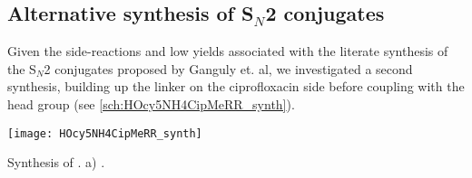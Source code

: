 \subsection{Alternative synthesis of S$_N$2 conjugates}

Given the side-reactions and low yields associated with the literate synthesis of the S$_N$2 conjugates proposed by Ganguly et. al\cite{Ganguly2011}, we investigated a second synthesis, building up the linker on the ciprofloxacin side before coupling with the head group (see \ref{sch:HOcy5NH4CipMeRR_synth}).

\begin{scheme}[H]
	\begin{center}
		\texttt{[image: HOcy5NH4CipMeRR\_synth]}
		\caption{Synthesis of . 
		a) . 
		\label{sch:HOcy5NH4CipMeRR_synth}}
	\end{center}
\end{scheme}